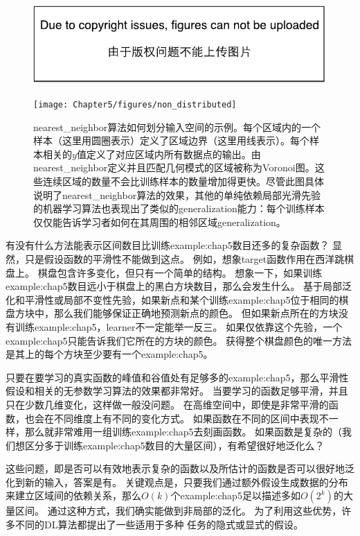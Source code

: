 \begin{figure}[!htb]
\ifOpenSource
\centerline{\includegraphics{figure.pdf}}
\else
\centerline{\texttt{[image: Chapter5/figures/non\_distributed]}}
\fi
\caption{\gls{nearest_neighbor}算法如何划分输入空间的示例。每个区域内的一个样本（这里用圆圈表示）定义了区域边界（这里用线表示）。每个样本相关的$y$值定义了对应区域内所有数据点的输出。由\gls{nearest_neighbor}定义并且匹配几何模式的区域被称为Voronoi图。这些连续区域的数量不会比训练样本的数量增加得更快。尽管此图具体说明了\gls{nearest_neighbor}算法的效果，其他的单纯依赖局部光滑先验的机器学习算法也表现出了类似的\gls{generalization}能力：每个训练样本仅仅能告诉学习者如何在其周围的相邻区域\gls{generalization}。}
\label{fig:chap5_non_distributed}
\end{figure}


有没有什么方法能表示区间数目比训练\gls{example:chap5}数目还多的复杂函数？
显然，只是假设函数的平滑性不能做到这点。
例如，想象\gls{target}函数作用在西洋跳棋盘上。
棋盘包含许多变化，但只有一个简单的结构。
想象一下，如果训练\gls{example:chap5}数目远小于棋盘上的黑白方块数目，那么会发生什么。
基于局部泛化和平滑性或局部不变性先验，如果新点和某个训练\gls{example:chap5}位于相同的棋盘方块中，那么我们能够保证正确地预测新点的颜色。
但如果新点所在的方块没有训练\gls{example:chap5}，\gls{learner}不一定能举一反三。
如果仅依靠这个先验，一个\gls{example:chap5}只能告诉我们它所在的方块的颜色。
获得整个棋盘颜色的唯一方法是其上的每个方块至少要有一个\gls{example:chap5}。


只要在要学习的真实函数的峰值和谷值处有足够多的\gls{example:chap5}，那么平滑性假设和相关的无参数学习算法的效果都非常好。
当要学习的函数足够平滑，并且只在少数几维变化，这样做一般没问题。
在高维空间中，即使是非常平滑的函数，也会在不同维度上有不同的变化方式。
如果函数在不同的区间中表现不一样，那么就非常难用一组训练\gls{example:chap5}去刻画函数。
如果函数是复杂的（我们想区分多于训练\gls{example:chap5}数目的大量区间），有希望很好地泛化么？

这些问题，即是否可以有效地表示复杂的函数以及所估计的函数是否可以很好地泛化到新的输入，答案是有。
关键观点是，只要我们通过额外假设生成数据的分布来建立区域间的依赖关系，那么$O(k)$个\gls{example:chap5}足以描述多如$O(2^k)$的大量区间。
通过这种方式，我们确实能做到非局部的泛化\citep{Bengio+Monperrus-2005,NIPS2005_539}。
为了利用这些优势，许多不同的\gls{DL}算法都提出了一些适用于多种\,\,任务的隐式或显式的假设。


